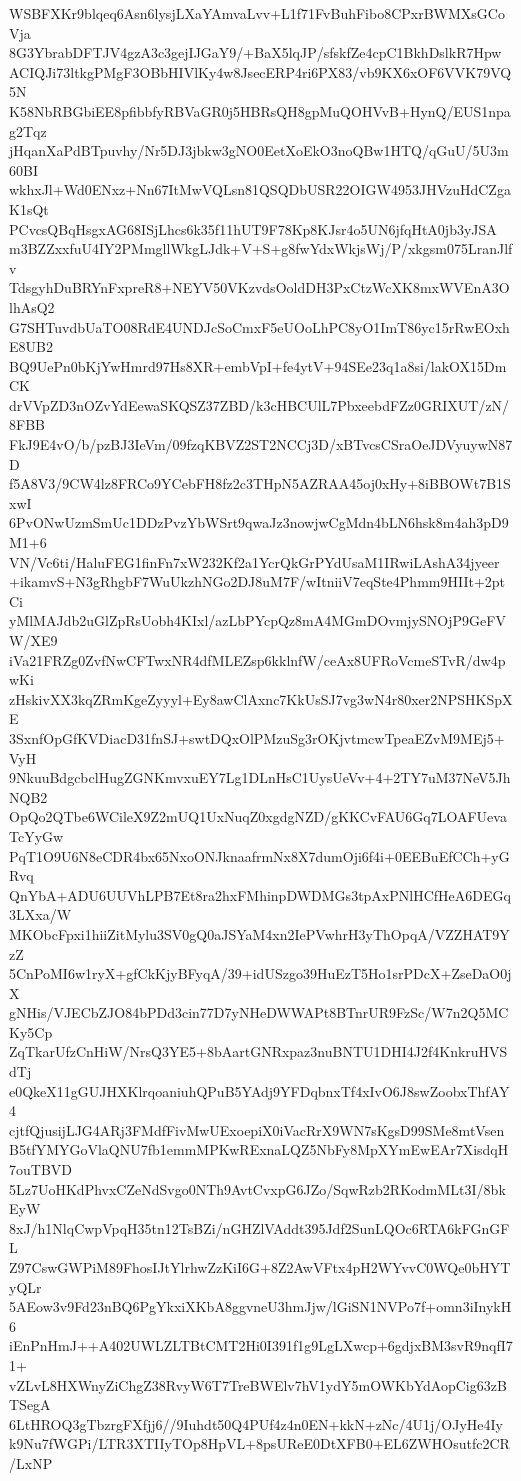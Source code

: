 WSBFXKr9blqeq6Asn6lysjLXaYAmvaLvv+L1f71FvBuhFibo8CPxrBWMXsGCoVja
8G3YbrabDFTJV4gzA3c3gejIJGaY9/+BaX5lqJP/sfskfZe4cpC1BkhDslkR7Hpw
ACIQJi73ltkgPMgF3OBbHIVlKy4w8JsecERP4ri6PX83/vb9KX6xOF6VVK79VQ5N
K58NbRBGbiEE8pfibbfyRBVaGR0j5HBRsQH8gpMuQOHVvB+HynQ/EUS1npag2Tqz
jHqanXaPdBTpuvhy/Nr5DJ3jbkw3gNO0EetXoEkO3noQBw1HTQ/qGuU/5U3m60BI
wkhxJl+Wd0ENxz+Nn67ItMwVQLsn81QSQDbUSR22OIGW4953JHVzuHdCZgaK1sQt
PCvcsQBqHsgxAG68ISjLhcs6k35f11hUT9F78Kp8KJsr4o5UN6jfqHtA0jb3yJSA
m3BZZxxfuU4IY2PMmgllWkgLJdk+V+S+g8fwYdxWkjsWj/P/xkgsm075LranJlfv
TdsgyhDuBRYnFxpreR8+NEYV50VKzvdsOoldDH3PxCtzWcXK8mxWVEnA3OlhAsQ2
G7SHTuvdbUaTO08RdE4UNDJcSoCmxF5eUOoLhPC8yO1ImT86yc15rRwEOxhE8UB2
BQ9UePn0bKjYwHmrd97Hs8XR+embVpI+fe4ytV+94SEe23q1a8si/lakOX15DmCK
drVVpZD3nOZvYdEewaSKQSZ37ZBD/k3cHBCUlL7PbxeebdFZz0GRIXUT/zN/8FBB
FkJ9E4vO/b/pzBJ3IeVm/09fzqKBVZ2ST2NCCj3D/xBTvcsCSraOeJDVyuywN87D
f5A8V3/9CW4lz8FRCo9YCebFH8fz2c3THpN5AZRAA45oj0xHy+8iBBOWt7B1SxwI
6PvONwUzmSmUc1DDzPvzYbWSrt9qwaJz3nowjwCgMdn4bLN6hsk8m4ah3pD9M1+6
VN/Vc6ti/HaluFEG1finFn7xW232Kf2a1YcrQkGrPYdUsaM1IRwiLAshA34jyeer
+ikamvS+N3gRhgbF7WuUkzhNGo2DJ8uM7F/wItniiV7eqSte4Phmm9HIIt+2ptCi
yMlMAJdb2uGlZpRsUobh4KIxl/azLbPYcpQz8mA4MGmDOvmjySNOjP9GeFVW/XE9
iVa21FRZg0ZvfNwCFTwxNR4dfMLEZsp6kklnfW/ceAx8UFRoVcmeSTvR/dw4pwKi
zHskivXX3kqZRmKgeZyyyl+Ey8awClAxnc7KkUsSJ7vg3wN4r80xer2NPSHKSpXE
3SxnfOpGfKVDiacD31fnSJ+swtDQxOlPMzuSg3rOKjvtmcwTpeaEZvM9MEj5+VyH
9NkuuBdgcbclHugZGNKmvxuEY7Lg1DLnHsC1UysUeVv+4+2TY7uM37NeV5JhNQB2
OpQo2QTbe6WCileX9Z2mUQ1UxNuqZ0xgdgNZD/gKKCvFAU6Gq7LOAFUevaTcYyGw
PqT1O9U6N8eCDR4bx65NxoONJknaafrmNx8X7dumOji6f4i+0EEBuEfCCh+yGRvq
QnYbA+ADU6UUVhLPB7Et8ra2hxFMhinpDWDMGs3tpAxPNlHCfHeA6DEGq3LXxa/W
MKObcFpxi1hiiZitMylu3SV0gQ0aJSYaM4xn2IePVwhrH3yThOpqA/VZZHAT9YzZ
5CnPoMI6w1ryX+gfCkKjyBFyqA/39+idUSzgo39HuEzT5Ho1srPDcX+ZseDaO0jX
gNHis/VJECbZJO84bPDd3cin77D7yNHeDWWAPt8BTnrUR9FzSc/W7n2Q5MCKy5Cp
ZqTkarUfzCnHiW/NrsQ3YE5+8bAartGNRxpaz3nuBNTU1DHI4J2f4KnkruHVSdTj
e0QkeX11gGUJHXKlrqoaniuhQPuB5YAdj9YFDqbnxTf4xIvO6J8swZoobxThfAY4
cjtfQjusijLJG4ARj3FMdfFivMwUExoepiX0iVacRrX9WN7sKgsD99SMe8mtVsen
B5tfYMYGoVlaQNU7fb1emmMPKwRExnaLQZ5NbFy8MpXYmEwEAr7XisdqH7ouTBVD
5Lz7UoHKdPhvxCZeNdSvgo0NTh9AvtCvxpG6JZo/SqwRzb2RKodmMLt3I/8bkEyW
8xJ/h1NlqCwpVpqH35tn12TsBZi/nGHZlVAddt395Jdf2SunLQOc6RTA6kFGnGFL
Z97CswGWPiM89FhosIJtYlrhwZzKiI6G+8Z2AwVFtx4pH2WYvvC0WQe0bHYTyQLr
5AEow3v9Fd23nBQ6PgYkxiXKbA8ggvneU3hmJjw/lGiSN1NVPo7f+omn3iInykH6
iEnPnHmJ++A402UWLZLTBtCMT2Hi0I391f1g9LgLXwcp+6gdjxBM3svR9nqfI71+
vZLvL8HXWnyZiChgZ38RvyW6T7TreBWElv7hV1ydY5mOWKbYdAopCig63zBTSegA
6LtHROQ3gTbzrgFXfjj6//9Iuhdt50Q4PUf4z4n0EN+kkN+zNc/4U1j/OJyHe4Iy
k9Nu7fWGPi/LTR3XTIIyTOp8HpVL+8psUReE0DtXFB0+EL6ZWHOsutfc2CR/LxNP
